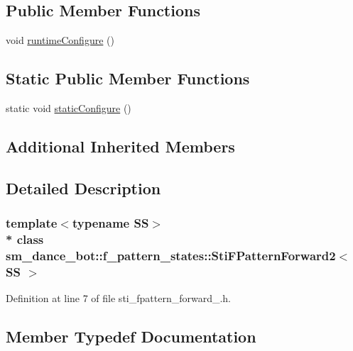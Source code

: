 \subsection*{Public Member Functions}
\begin{DoxyCompactItemize}
\item 
void \hyperlink{structsm__dance__bot_1_1f__pattern__states_1_1StiFPatternForward2_aa0f9a89b6a80ba4ff11e31a223ace103}{runtime\+Configure} ()
\end{DoxyCompactItemize}
\subsection*{Static Public Member Functions}
\begin{DoxyCompactItemize}
\item 
static void \hyperlink{structsm__dance__bot_1_1f__pattern__states_1_1StiFPatternForward2_a2bb546f83ecf369193a0a51b5c2e3f7e}{static\+Configure} ()
\end{DoxyCompactItemize}
\subsection*{Additional Inherited Members}


\subsection{Detailed Description}
\subsubsection*{template$<$typename SS$>$\\*
class sm\+\_\+dance\+\_\+bot\+::f\+\_\+pattern\+\_\+states\+::\+Sti\+F\+Pattern\+Forward2$<$ S\+S $>$}



Definition at line 7 of file sti\+\_\+fpattern\+\_\+forward\+\_.\+h.



\subsection{Member Typedef Documentation}
